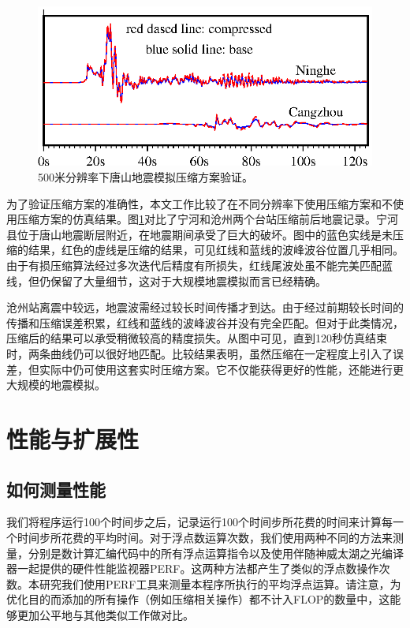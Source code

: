 \documentclass[degree=doctor]{thuthesis}
\begin{document}
\begin{figure}[ht]
\centering
\includegraphics[width=0.8\columnwidth]{CompareCompress.eps}
\caption{500米分辨率下唐山地震模拟压缩方案验证。}
\label{fig:compress_valid}
\end{figure}

为了验证压缩方案的准确性，本文工作比较了在不同分辨率下使用压缩方案和不使用压缩方案的仿真结果。图\ref {fig:compress_valid}对比了宁河和沧州两个台站压缩前后地震记录。宁河县位于唐山地震断层附近，在地震期间承受了巨大的破坏。图中的蓝色实线是未压缩的结果，红色的虚线是压缩的结果，可见红线和蓝线的波峰波谷位置几乎相同。由于有损压缩算法经过多次迭代后精度有所损失，红线尾波处虽不能完美匹配蓝线，但仍保留了大量细节，这对于大规模地震模拟而言已经精确。

沧州站离震中较远，地震波需经过较长时间传播才到达。由于经过前期较长时间的传播和压缩误差积累，红线和蓝线的波峰波谷并没有完全匹配。但对于此类情况，压缩后的结果可以承受稍微较高的精度损失。从图中可见，直到120秒仿真结束时，两条曲线仍可以很好地匹配。比较结果表明，虽然压缩在一定程度上引入了误差，但实际中仍可使用这套实时压缩方案。它不仅能获得更好的性能，还能进行更大规模的地震模拟。

\section{性能与扩展性}

\subsection{如何测量性能}

我们将程序运行100个时间步之后，记录运行100个时间步所花费的时间来计算每一个时间步所花费的平均时间。对于浮点数运算次数，我们使用两种不同的方法来测量，分别是数计算汇编代码中的所有浮点运算指令以及使用伴随神威太湖之光编译器一起提供的硬件性能监视器PERF。这两种方法都产生了类似的浮点数操作次数。本研究我们使用PERF工具来测量本程序所执行的平均浮点运算。请注意，为优化目的而添加的所有操作（例如压缩相关操作）都不计入FLOP的数量中，这能够更加公平地与其他类似工作做对比。
\end{document}
